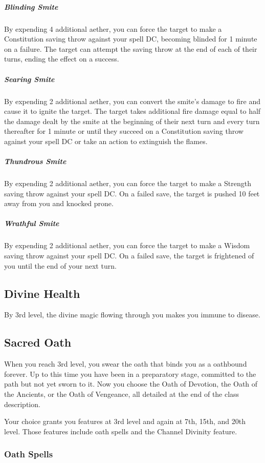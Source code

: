 \subparagraph*{Blinding Smite} By expending 4 additional aether, you can force the target to make a Constitution saving throw against your spell DC, becoming blinded for 1 minute on a failure. The target can attempt the saving throw at the end of each of their turns, ending the effect on a success.

\subparagraph*{Searing Smite} By expending 2 additional aether, you can convert the smite's damage to fire and cause it to ignite the target. The target takes additional fire damage equal to half the damage dealt by the smite at the beginning of their next turn and every turn thereafter for 1 minute or until they succeed on a Constitution saving throw against your spell DC or take an action to extinguish the flames.

\subparagraph*{Thundrous Smite} By expending 2 additional aether, you can force the target to make a Strength saving throw against your spell DC. On a failed save, the target is pushed 10 feet away from you and knocked prone.

\subparagraph*{Wrathful Smite} By expending 2 additional aether, you can force the target to make a Wisdom saving throw against your spell DC. On a failed save, the target is frightened of you until the end of your next turn.

\subsection{Divine Health}

By 3rd level, the divine magic flowing through you makes you immune to disease.

\subsection{Sacred Oath}

When you reach 3rd level, you swear the oath that binds you as a oathbound forever. Up to this time you have been in a preparatory stage, committed to the path but not yet sworn to it. Now you choose the Oath of Devotion, the Oath of the Ancients, or the Oath of Vengeance, all detailed at the end of the class description.

Your choice grants you features at 3rd level and again at 7th, 15th, and 20th level. Those features include oath spells and the Channel Divinity feature.

\subsubsection{Oath Spells}

